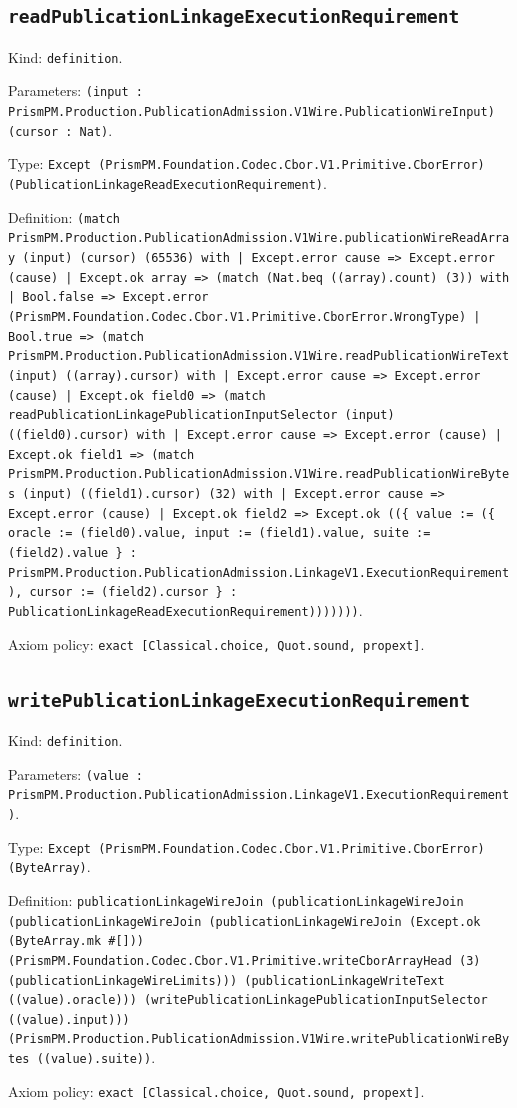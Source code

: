 \documentclass[11pt]{article}
\begin{document}
\subsection*{\texttt{readPublicationLinkageExecutionRequirement}}
\noindent Kind: \texttt{definition}.\par
\noindent Parameters: \texttt{(input : PrismPM.Production.PublicationAdmission.V1Wire.PublicationWireInput) (cursor : Nat)}.\par
\noindent Type: \texttt{Except (PrismPM.Foundation.Codec.Cbor.V1.Primitive.CborError) (PublicationLinkageReadExecutionRequirement)}.\par
\noindent Definition: \texttt{(match PrismPM.Production.PublicationAdmission.V1Wire.publicationWireReadArray (input) (cursor) (65536) with | Except.error cause => Except.error (cause) | Except.ok array => (match (Nat.beq ((array).count) (3)) with | Bool.false => Except.error (PrismPM.Foundation.Codec.Cbor.V1.Primitive.CborError.WrongType) | Bool.true => (match PrismPM.Production.PublicationAdmission.V1Wire.readPublicationWireText (input) ((array).cursor) with | Except.error cause => Except.error (cause) | Except.ok field0 => (match readPublicationLinkagePublicationInputSelector (input) ((field0).cursor) with | Except.error cause => Except.error (cause) | Except.ok field1 => (match PrismPM.Production.PublicationAdmission.V1Wire.readPublicationWireBytes (input) ((field1).cursor) (32) with | Except.error cause => Except.error (cause) | Except.ok field2 => Except.ok ((\{ value := (\{ oracle := (field0).value, input := (field1).value, suite := (field2).value \} : PrismPM.Production.PublicationAdmission.LinkageV1.ExecutionRequirement), cursor := (field2).cursor \} : PublicationLinkageReadExecutionRequirement)))))))}.\par
\noindent Axiom policy: \texttt{exact [Classical.choice, Quot.sound, propext]}.\par
\subsection*{\texttt{writePublicationLinkageExecutionRequirement}}
\noindent Kind: \texttt{definition}.\par
\noindent Parameters: \texttt{(value : PrismPM.Production.PublicationAdmission.LinkageV1.ExecutionRequirement)}.\par
\noindent Type: \texttt{Except (PrismPM.Foundation.Codec.Cbor.V1.Primitive.CborError) (ByteArray)}.\par
\noindent Definition: \texttt{publicationLinkageWireJoin (publicationLinkageWireJoin (publicationLinkageWireJoin (publicationLinkageWireJoin (Except.ok (ByteArray.mk \#[])) (PrismPM.Foundation.Codec.Cbor.V1.Primitive.writeCborArrayHead (3) (publicationLinkageWireLimits))) (publicationLinkageWriteText ((value).oracle))) (writePublicationLinkagePublicationInputSelector ((value).input))) (PrismPM.Production.PublicationAdmission.V1Wire.writePublicationWireBytes ((value).suite))}.\par
\noindent Axiom policy: \texttt{exact [Classical.choice, Quot.sound, propext]}.\par
\end{document}
